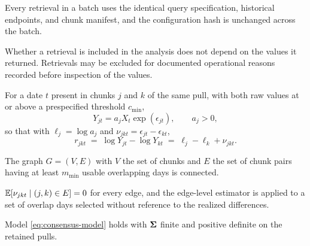 \documentclass[12pt,a4paper,oneside]{article}
\begin{document}
\begin{assumption}\label{as:protocol}
Every retrieval in a batch uses the identical query specification, historical
endpoints, and chunk manifest, and the configuration hash is unchanged across
the batch.
\end{assumption}

\begin{assumption}\label{as:inclusion}
Whether a retrieval is included in the analysis does not depend on the values it
returned. Retrievals may be excluded for documented operational reasons recorded
before inspection of the values.
\end{assumption}

\begin{assumption}\label{as:overlap}
For a date $t$ present in chunks $j$ and $k$ of the same pull, with both raw
values at or above a prespecified threshold $c_{\min}$,
\begin{equation}
Y_{jt} = a_j X_t \exp(\epsilon_{jt}), \qquad a_j > 0,
\label{eq:chunk-model}
\end{equation}
so that with $\ell_j = \log a_j$ and $\nu_{jkt} = \epsilon_{jt} - \epsilon_{kt}$,
\begin{equation}
r_{jkt} \;=\; \log Y_{jt} - \log Y_{kt} \;=\; \ell_j - \ell_k + \nu_{jkt}.
\label{eq:edge-model}
\end{equation}
\end{assumption}

\begin{assumption}\label{as:connected}
The graph $G=(V,E)$ with $V$ the set of chunks and $E$ the set of chunk pairs
having at least $m_{\min}$ usable overlapping days is connected.
\end{assumption}

\begin{assumption}\label{as:edge-mean}
$\mathbb{E}[\nu_{jkt} \mid (j,k) \in E] = 0$ for every edge, and the edge-level
estimator is applied to a set of overlap days selected without reference to the
realized differences.
\end{assumption}

\begin{assumption}\label{as:common}
Model \eqref{eq:consensus-model} holds with $\bm{\Sigma}$ finite and positive definite
on the retained pulls.
\end{assumption}
\end{document}
